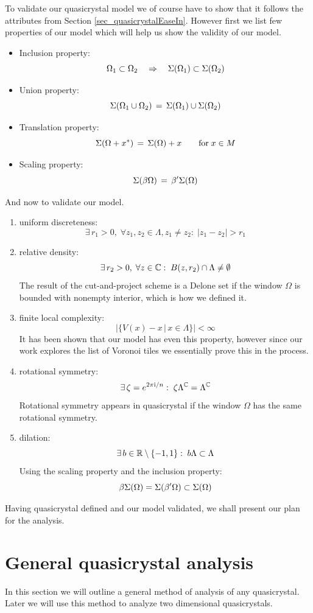\documentclass[text.tex]{subfiles}
\begin{document}
To validate our quasicrystal model we of course have to show that it follows the attributes from Section \ref{sec_quasicrystalEaseIn}. However first we list few properties of our model which will help us show the validity of our model. 

\begin{itemize}
\item Inclusion property: $$\Omega_1\subset\Omega_2 \quad\Rightarrow\quad \Sigma(\Omega_1)\subset\Sigma(\Omega_2)$$
\item Union property: $$\Sigma(\Omega_1\cup\Omega_2) \,=\, \Sigma(\Omega_1)\cup\Sigma(\Omega_2)$$
\item Translation property: $$\Sigma(\Omega+x^\ast) \,=\, \Sigma(\Omega)+x\qquad \text{for}\; x\in M$$
\item Scaling property: $$\Sigma(\beta\Omega) \,=\, \beta'\Sigma(\Omega)$$
\end{itemize}

And now to validate our model. 

\begin{enumerate}
\item uniform discreteness: $$\exists\,r_1>0,\; \forall z_1,z_2\in\Lambda, z_1\neq z_2:\; |z_1-z_2|>r_1$$
\item relative density: $$\exists\,r_2>0,\; \forall z\in\mathbb{C}:\; B(z,r_2)\cap\Lambda \neq \emptyset$$
The result of the cut-and-project scheme is a Delone set \cite{lagarias} if the window $\Omega$ is bounded with nonempty interior, which is how we defined it. 
\item finite local complexity: $$\big|\{V(x)-x\,|\, x\in \Lambda\}\big|<\infty$$
It has been shown \cite{lagarias} that our model has even this property, however since our work explores the list of Voronoi tiles we essentially prove this in the process. 
\item rotational symmetry: $$\exists\,\zeta = e^{2\pi \mathrm{i}/n}:\; \zeta\Lambda^{\mathbb{C}} = \Lambda^{\mathbb{C}}$$
Rotational symmetry appears in quasicrystal if the window $\Omega$ has the same rotational symmetry.
\item dilation: $$\exists\,b\in\mathbb{R}\setminus\{-1,1\}:\; b\Lambda\subset \Lambda$$
Using the scaling property and the inclusion property:
$$\beta\Sigma(\Omega) = \Sigma(\beta'\Omega) \subset \Sigma(\Omega)$$
\end{enumerate}

Having quasicrystal defined and  our model validated, we shall present our plan for the analysis. 

\section{General quasicrystal analysis}
In this section we will outline a general method of analysis of any quasicrystal. Later we will use this method to analyze two dimensional quasicrystals. 
\end{document}

